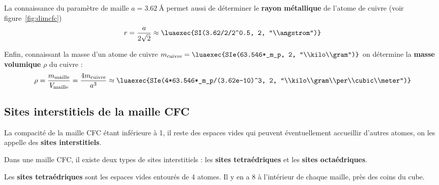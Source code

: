 \documentclass{cours}
\begin{document}
La connaissance du paramètre de maille $a=\SI{3.62}{\angstrom}$ permet aussi de déterminer le \textbf{rayon métallique} de l'atome de cuivre (voir figure~\ref{fig:dimcfc})
\begin{equation}
  r = \frac{a}{2 \sqrt{2}} \approx \luaexec{SI(3.62/2/2^0.5, 2, "\\angstrom")}
\end{equation}

Enfin, connaissant la masse d'un atome de cuivre $m_\text{cuivre}=\luaexec{SIe(63.546*_m_p, 2, "\\kilo\\gram")}$ on détermine la \textbf{masse volumique} $\rho$ du cuivre :
\begin{equation}
  \rho = \frac{m_\text{maille}}{V_\text{maille}} = \frac{4m_\text{cuivre}}{a^3} \approx \luaexec{SIe(4*63.546*_m_p/(3.62e-10)^3, 2, "\\kilo\\gram\\per\\cubic\\meter")}
\end{equation}

\subsection{Sites interstitiels de la maille CFC}%
\label{sub:sites_intersticiels_de_la_maille_cfc}
La compacité de la maille CFC étant inférieure à 1, il reste des espaces vides qui peuvent éventuellement accueillir d'autres atomes, on les appelle des \textbf{sites interstitiels}.

Dans une maille CFC, il existe deux types de sites interstitiels : les \textbf{sites tetraédriques} et les \textbf{sites octaédriques}.

Les \textbf{sites tetraédriques} sont les espaces vides entourés de 4 atomes. Il y en a 8 à l'intérieur de chaque maille, près des coins du cube.
\end{document}
